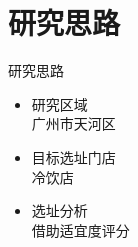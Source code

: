 \documentclass{beamer}
\begin{document}
\section{研究思路}
\begin{frame}{研究思路}
    \begin{itemize}
        \item 研究区域\\
        {\textcolor[RGB]{255,0,0}{广州市天河区}}
        \item 目标选址门店 \\
        {\textcolor[RGB]{255,0,0}{冷饮店}}
        \item 选址分析 \\
        {\textcolor[RGB]{255,0,0}{借助适宜度评分}}
    \end{itemize}

\end{frame}

\end{document}
